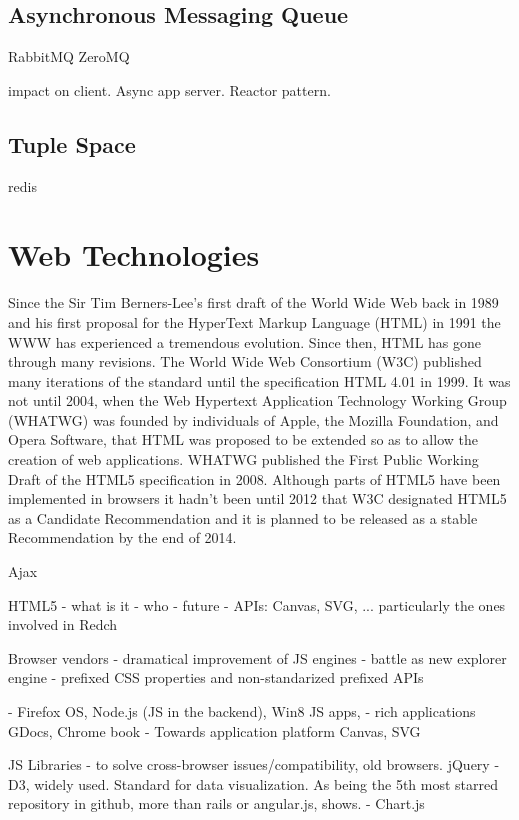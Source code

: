 \subsection{Asynchronous Messaging Queue}
RabbitMQ
ZeroMQ

impact on client. Async app server. Reactor pattern.

\subsection{Tuple Space}
redis

\section{Web Technologies}

Since the Sir Tim Berners-Lee's first draft of the World Wide Web back in 1989 and his first proposal for the HyperText Markup Language (HTML) \cite{HTMLtags} in 1991 the WWW has experienced a tremendous evolution. Since then, HTML has gone through many revisions. The World Wide Web Consortium (W3C) published many iterations of the standard until the specification HTML 4.01 in 1999. It was not until 2004, when the Web Hypertext Application Technology Working Group (WHATWG) was founded by individuals of Apple, the Mozilla Foundation, and Opera Software, that HTML was proposed to be extended so as to allow the creation of web applications. WHATWG published the First Public Working Draft of the HTML5 specification in 2008. Although parts of HTML5 have been implemented in browsers it hadn't been until 2012 that W3C designated HTML5 as a Candidate Recommendation and it is planned to be released as a stable Recommendation by the end of 2014.


Ajax

HTML5	
	- what is it
	- who
	- future
	- APIs: Canvas, SVG, ... particularly the ones involved in Redch

Browser vendors
	- dramatical improvement of JS engines
	- battle as new explorer engine
	- prefixed CSS properties and non-standarized prefixed APIs

	- Firefox OS, Node.js (JS in the backend), Win8 JS apps, 
	- rich applications GDocs, Chrome book
	- Towards application platform
Canvas, SVG

JS Libraries
	- to solve cross-browser issues/compatibility, old browsers. jQuery
	- D3, widely used. Standard for data visualization. As being the 5th most starred repository in github, more than rails or angular.js, shows.
	- Chart.js

